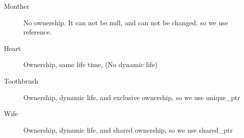 \documentclass[a4paper,11pt,twoside]{book}
\begin{document}
\begin{itemize}
\begin{enumerate}
\begin{description}
	\item[Monther] No ownership. It can not be null, and can not be changed.  so we use reference. 
	
	\item[Heart] Ownership, same life time, (No dynamic life)
	
	\item [Toothbrush] Ownership, dynamic life, and exclusive ownership, so we use unique\_ptr
	
	\item [Wife] Ownership, dynamic life, and shared ownership, so we use shared\_ptr
\end{description}

\end{enumerate}
\end{itemize}
\end{document}
